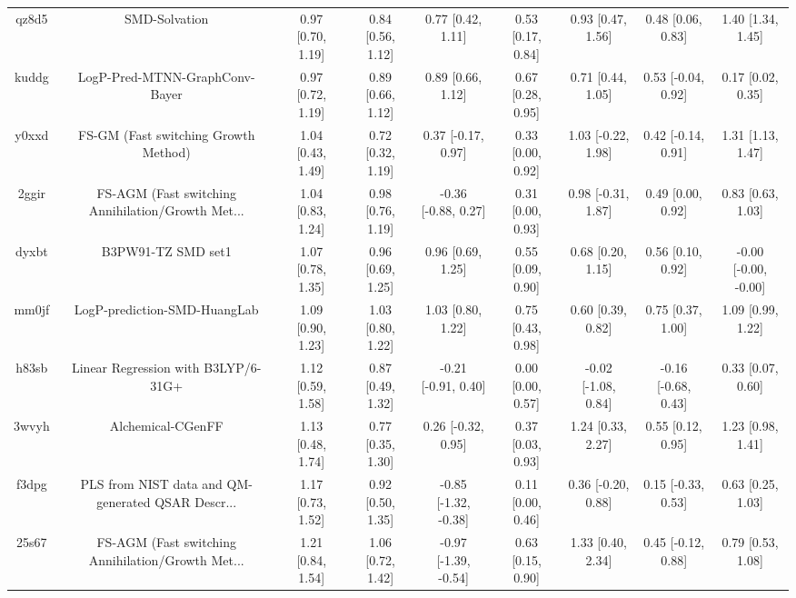 \documentclass{article}
\begin{document}
\begin{center}
\begin{longtable}{|ccccccccc|}
 qz8d5 &                                      SMD-Solvation &  0.97 [0.70, 1.19] &  0.84 [0.56, 1.12] &     0.77 [0.42, 1.11] &  0.53 [0.17, 0.84] &    0.93 [0.47, 1.56] &    0.48 [0.06, 0.83] &     1.40 [1.34, 1.45] \\
 kuddg &                     LogP-Pred-MTNN-GraphConv-Bayer &  0.97 [0.72, 1.19] &  0.89 [0.66, 1.12] &     0.89 [0.66, 1.12] &  0.67 [0.28, 0.95] &    0.71 [0.44, 1.05] &   0.53 [-0.04, 0.92] &     0.17 [0.02, 0.35] \\
 y0xxd &               FS-GM (Fast switching Growth Method) &  1.04 [0.43, 1.49] &  0.72 [0.32, 1.19] &    0.37 [-0.17, 0.97] &  0.33 [0.00, 0.92] &   1.03 [-0.22, 1.98] &   0.42 [-0.14, 0.91] &     1.31 [1.13, 1.47] \\
 2ggir &  FS-AGM (Fast switching Annihilation/Growth Met... &  1.04 [0.83, 1.24] &  0.98 [0.76, 1.19] &   -0.36 [-0.88, 0.27] &  0.31 [0.00, 0.93] &   0.98 [-0.31, 1.87] &    0.49 [0.00, 0.92] &     0.83 [0.63, 1.03] \\
 dyxbt &                                 B3PW91-TZ SMD set1 &  1.07 [0.78, 1.35] &  0.96 [0.69, 1.25] &     0.96 [0.69, 1.25] &  0.55 [0.09, 0.90] &    0.68 [0.20, 1.15] &    0.56 [0.10, 0.92] &  -0.00 [-0.00, -0.00] \\
 mm0jf &                       LogP-prediction-SMD-HuangLab &  1.09 [0.90, 1.23] &  1.03 [0.80, 1.22] &     1.03 [0.80, 1.22] &  0.75 [0.43, 0.98] &    0.60 [0.39, 0.82] &    0.75 [0.37, 1.00] &     1.09 [0.99, 1.22] \\
 h83sb &                Linear Regression with B3LYP/6-31G+ &  1.12 [0.59, 1.58] &  0.87 [0.49, 1.32] &   -0.21 [-0.91, 0.40] &  0.00 [0.00, 0.57] &  -0.02 [-1.08, 0.84] &  -0.16 [-0.68, 0.43] &     0.33 [0.07, 0.60] \\
 3wvyh &                                  Alchemical-CGenFF &  1.13 [0.48, 1.74] &  0.77 [0.35, 1.30] &    0.26 [-0.32, 0.95] &  0.37 [0.03, 0.93] &    1.24 [0.33, 2.27] &    0.55 [0.12, 0.95] &     1.23 [0.98, 1.41] \\
 f3dpg &  PLS from NIST data and QM-generated QSAR Descr... &  1.17 [0.73, 1.52] &  0.92 [0.50, 1.35] &  -0.85 [-1.32, -0.38] &  0.11 [0.00, 0.46] &   0.36 [-0.20, 0.88] &   0.15 [-0.33, 0.53] &     0.63 [0.25, 1.03] \\
 25s67 &  FS-AGM (Fast switching Annihilation/Growth Met... &  1.21 [0.84, 1.54] &  1.06 [0.72, 1.42] &  -0.97 [-1.39, -0.54] &  0.63 [0.15, 0.90] &    1.33 [0.40, 2.34] &   0.45 [-0.12, 0.88] &     0.79 [0.53, 1.08] \\

\end{longtable}
\end{center}
\end{document}
